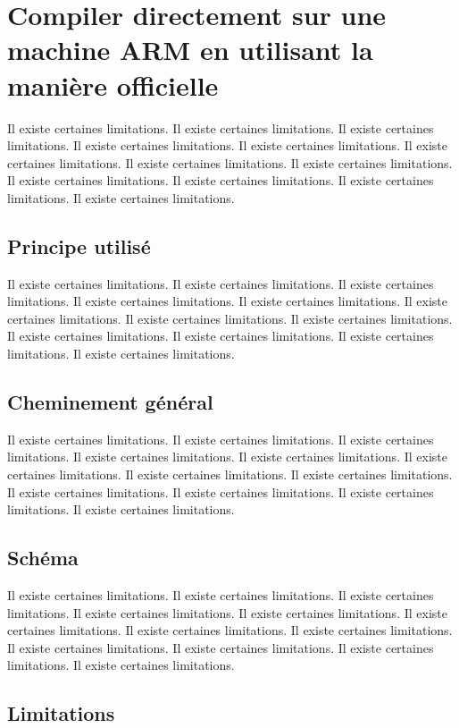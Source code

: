 \documentclass[11pt,a4paper,oneside]{report}
\begin{document}
\section{Compiler directement sur une machine ARM en utilisant la manière officielle}

Il existe certaines limitations.
Il existe certaines limitations.
Il existe certaines limitations.
Il existe certaines limitations.
Il existe certaines limitations.
Il existe certaines limitations.
Il existe certaines limitations.
Il existe certaines limitations.
Il existe certaines limitations.
Il existe certaines limitations.
Il existe certaines limitations.
Il existe certaines limitations.
\subsection{Principe utilisé}

Il existe certaines limitations.
Il existe certaines limitations.
Il existe certaines limitations.
Il existe certaines limitations.
Il existe certaines limitations.
Il existe certaines limitations.
Il existe certaines limitations.
Il existe certaines limitations.
Il existe certaines limitations.
Il existe certaines limitations.
Il existe certaines limitations.
Il existe certaines limitations.
\subsection{Cheminement général}

Il existe certaines limitations.
Il existe certaines limitations.
Il existe certaines limitations.
Il existe certaines limitations.
Il existe certaines limitations.
Il existe certaines limitations.
Il existe certaines limitations.
Il existe certaines limitations.
Il existe certaines limitations.
Il existe certaines limitations.
Il existe certaines limitations.
Il existe certaines limitations.
\subsection{Schéma}

Il existe certaines limitations.
Il existe certaines limitations.
Il existe certaines limitations.
Il existe certaines limitations.
Il existe certaines limitations.
Il existe certaines limitations.
Il existe certaines limitations.
Il existe certaines limitations.
Il existe certaines limitations.
Il existe certaines limitations.
Il existe certaines limitations.
Il existe certaines limitations.
\subsection{Limitations}
\end{document}
